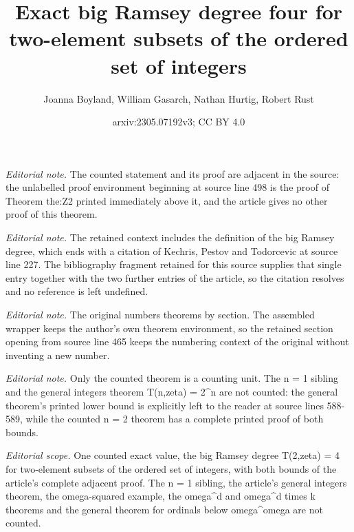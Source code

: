 \documentclass[10pt,a4paper]{article}
\title{Exact big Ramsey degree four for two-element subsets of the ordered set of integers}
\author{Joanna Boyland, William Gasarch, Nathan Hurtig, Robert Rust}
\date{arxiv:2305.07192v3; CC BY 4.0}
\theoremstyle{plain}
\theoremstyle{definition}
\begin{document}
\maketitle
\noindent\textit{Editorial note.} The counted statement and its proof are adjacent in the source: the unlabelled proof environment beginning at source line 498 is the proof of Theorem the:Z2 printed immediately above it, and the article gives no other proof of this theorem.\par\medskip
\noindent\textit{Editorial note.} The retained context includes the definition of the big Ramsey degree, which ends with a citation of Kechris, Pestov and Todorcevic at source line 227. The bibliography fragment retained for this source supplies that single entry together with the two further entries of the article, so the citation resolves and no reference is left undefined.\par\medskip
\noindent\textit{Editorial note.} The original numbers theorems by section. The assembled wrapper keeps the author's own theorem environment, so the retained section opening from source line 465 keeps the numbering context of the original without inventing a new number.\par\medskip
\noindent\textit{Editorial note.} Only the counted theorem is a counting unit. The n = 1 sibling and the general integers theorem T(n,zeta) = 2\textasciicircum{}n are not counted: the general theorem's printed lower bound is explicitly left to the reader at source lines 588-589, while the counted n = 2 theorem has a complete printed proof of both bounds.\par\medskip
\noindent\textit{Editorial scope.} One counted exact value, the big Ramsey degree T(2,zeta) = 4 for two-element subsets of the ordered set of integers, with both bounds of the article's complete adjacent proof. The n = 1 sibling, the article's general integers theorem, the omega-squared example, the omega\textasciicircum{}d and omega\textasciicircum{}d times k theorems and the general theorem for ordinals below omega\textasciicircum{}omega are not counted.\par\medskip
\end{document}
